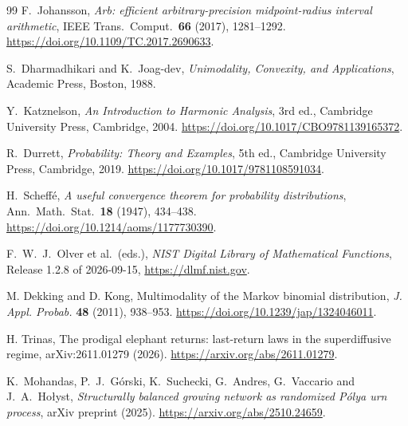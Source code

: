\documentclass[EJP,preprint]{ejpecp}
\begin{document}
\begin{thebibliography}{99}
F.~Johansson, \emph{Arb: efficient arbitrary-precision midpoint-radius
interval arithmetic}, IEEE Trans.\ Comput.\ \textbf{66} (2017), 1281--1292.
\url{https://doi.org/10.1109/TC.2017.2690633}.

S.~Dharmadhikari and K.~Joag-dev, \emph{Unimodality, Convexity, and
Applications}, Academic Press, Boston, 1988.

Y.~Katznelson, \emph{An Introduction to Harmonic Analysis}, 3rd ed., Cambridge
University Press, Cambridge, 2004.
\url{https://doi.org/10.1017/CBO9781139165372}.

R.~Durrett, \emph{Probability: Theory and Examples}, 5th ed., Cambridge University
Press, Cambridge, 2019.
\url{https://doi.org/10.1017/9781108591034}.

H.~Scheff\'e, \emph{A useful convergence theorem for probability distributions},
Ann.\ Math.\ Stat.\ \textbf{18} (1947), 434--438.
\url{https://doi.org/10.1214/aoms/1177730390}.

F.~W.~J.~Olver et al.\ (eds.), \emph{NIST Digital Library of Mathematical
Functions}, Release 1.2.8 of 2026-09-15, \url{https://dlmf.nist.gov}.

 M. Dekking and D. Kong,
Multimodality of the Markov binomial distribution,
\emph{J. Appl. Probab.} \textbf{48} (2011), 938--953.
\url{https://doi.org/10.1239/jap/1324046011}.

 H. Trinas,
The prodigal elephant returns: last-return laws in the superdiffusive regime,
arXiv:2611.01279 (2026).
\url{https://arxiv.org/abs/2611.01279}.

K.~Mohandas, P.~J.~G\'orski, K.~Suchecki, G.~Andres, G.~Vaccario and J.~A.~Ho{\l}yst,
\emph{Structurally balanced growing network as randomized P\'olya urn process},
arXiv preprint (2025).
\url{https://arxiv.org/abs/2510.24659}.
\end{thebibliography}
\end{document}
